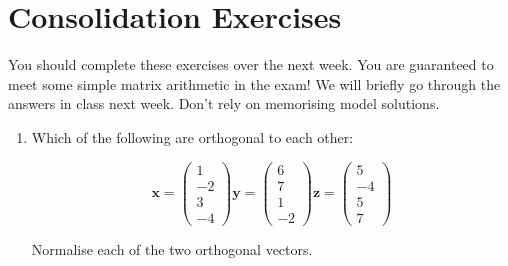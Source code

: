 \documentclass{article}
\begin{document}
\section{Consolidation Exercises}

You should complete these exercises over the next week.   You are guaranteed to meet some simple matrix arithmetic in the exam!   We will briefly go through the answers in class next week.   Don't rely on memorising model solutions.

\begin{enumerate}
\item Which of the following are orthogonal to each other:

\begin{displaymath}
\boldsymbol{x} = \left( \begin{array}{r} 1 \\ -2 \\ 3 \\ -4 \end{array} \right)
\boldsymbol{y} = \left( \begin{array}{r} 6 \\ 7 \\ 1 \\ -2 \end{array} \right)
\boldsymbol{z} = \left( \begin{array}{r} 5 \\ -4 \\ 5 \\ 7 \end{array} \right)
\end{displaymath}

Normalise each of the two orthogonal vectors.




\end{enumerate}
\end{document}
